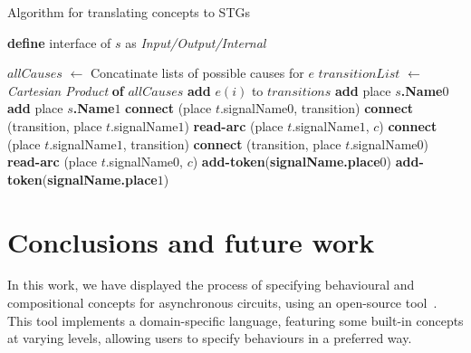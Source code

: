 \documentclass[british,conference,compsoc]{IEEEtran}
\begin{document}
\begin{algorithm}[t]
\begin{algorithmic}
\caption{Algorithm for translating concepts to STGs\label{alg:translation}}
  \State \textbf{define} interface of $s$ as \emph{Input/Output/Internal}
\EndFor

  \State $allCauses$ $\leftarrow$ Concatinate lists of possible causes for $e$
  \State $transitionList$ $\leftarrow$ \emph{Cartesian Product} \textbf{of} 
	$allCauses$
    \State \textbf{add} $e(i)$ to $transitions$
  \EndFor 
\EndFor
{}
  \State \textbf{add} place \textbf{$s$.Name}$0$
  \State \textbf{add} place \textbf{$s$.Name}$1$
\EndFor
{}
    \State \textbf{connect} (place $t$.signalName$0$, transition)
    \State \textbf{connect} (transition, place $t$.signalName$1$)
      \State \textbf{read-arc} (place $t$.signalName$1$, $c$)
    \EndFor
  \EndIf
    \State \textbf{connect} (place $t$.signalName$1$, transition)
    \State \textbf{connect} (transition, place $t$.signalName$0$)
      \State \textbf{read-arc} (place $t$.signalName$0$, $c$)
    \EndFor
  \EndIf
\EndFor
{}
    \State \textbf{add-token}(\textbf{signalName.place}$0$)
  \EndIf 
    \State \textbf{add-token}(\textbf{signalName.place}$1$)
  \EndIf
\EndFor
\end{algorithmic}
\end{algorithm}

\vspace{-2mm}

\section{Conclusions and future work\label{sec:conclusions}}

\vspace{-3mm}

In this work, we have displayed the process of specifying behavioural and 
compositional concepts for asynchronous circuits, using an open-source
tool~\cite{2016_concepts_github}. This tool implements a domain-specific 
language, featuring some built-in concepts at varying levels, allowing users to
specify behaviours in a preferred way. 
\end{document}
